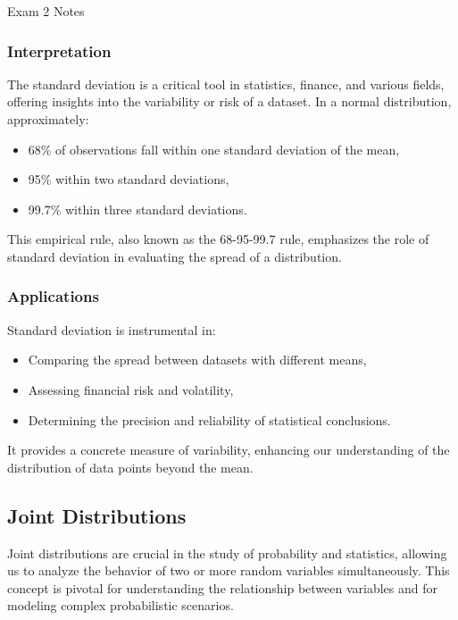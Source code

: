 \begin{examnotes}{Exam 2 Notes}
    \subsubsection*{Interpretation}
    
    The standard deviation is a critical tool in statistics, finance, and various fields, offering insights into the variability or risk of a dataset. In a normal distribution, approximately:
    \begin{itemize}
        \item 68\% of observations fall within one standard deviation of the mean,
        \item 95\% within two standard deviations,
        \item 99.7\% within three standard deviations.
    \end{itemize}
    
    This empirical rule, also known as the 68-95-99.7 rule, emphasizes the role of standard deviation in evaluating the spread of a distribution.
    
    \subsubsection*{Applications}
    
    Standard deviation is instrumental in:
    \begin{itemize}
        \item Comparing the spread between datasets with different means,
        \item Assessing financial risk and volatility,
        \item Determining the precision and reliability of statistical conclusions.
    \end{itemize}
    
    It provides a concrete measure of variability, enhancing our understanding of the distribution of data points beyond the mean.
    
    \subsection*{Joint Distributions}

    Joint distributions are crucial in the study of probability and statistics, allowing us to analyze the behavior of two or more random variables simultaneously. This concept is pivotal for understanding 
    the relationship between variables and for modeling complex probabilistic scenarios.
    

\end{examnotes}
